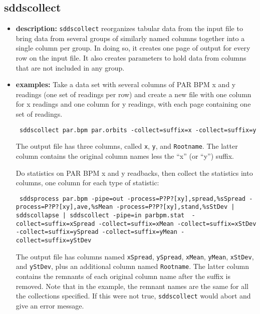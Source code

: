 \newpage 
 
\subsection{sddscollect} 
\label{sddscollect} 
 
\begin{itemize} 
\item {\bf description:} 
\verb|sddscollect| reorganizes tabular data from the input file 
to bring data from several groups of similarly named columns together into  
a single column per group.  In doing so, it creates one page of output 
for every row on the input file.  It also creates parameters to 
hold data from columns that are not included in any group. 
 
\item {\bf examples:}  
Take a data set with several columns of PAR BPM x and y 
readings (one set of readings per row) and create a new file with one column for x 
readings and one column for y readings, with each  
page containing one set of readings.
\begin{flushleft}{\tt 
sddscollect par.bpm par.orbits -collect=suffix=x -collect=suffix=y 
}\end{flushleft} 
The output file has three columns, called \verb|x|, \verb|y|, and 
\verb|Rootname|.  The latter column contains the original column 
names less the ``x'' (or ``y'') suffix.   
 
Do statistics on PAR BPM x and y readbacks, then collect the statistics  
into columns, one column for each type of statistic: 
\begin{flushleft}{\tt  
sddsprocess par.bpm -pipe=out -process=P?P?[xy],spread,\%sSpread  
-process=P?P?[xy],ave,\%sMean -process=P?P?[xy],stand,\%sStDev  
| sddscollapse  
| sddscollect -pipe=in parbpm.stat \ 
  -collect=suffix=xSpread -collect=suffix=xMean -collect=suffix=xStDev 
  -collect=suffix=ySpread -collect=suffix=yMean -collect=suffix=yStDev 
} 
\end{flushleft} 
The output file has columns named {\tt xSpread}, {\tt ySpread},  
{\tt xMean}, {\tt yMean}, {\tt xStDev}, 
and {\tt yStDev}, plus an additional column named {\tt Rootname}. 
The latter column contains the remnants of each original column 
name after the suffix is removed.  Note that in the example, 
the remnant names are the same for all the collections specified. 
If this were not true, \verb|sddscollect| would abort and give 
an error message. 
 

\end{itemize}
